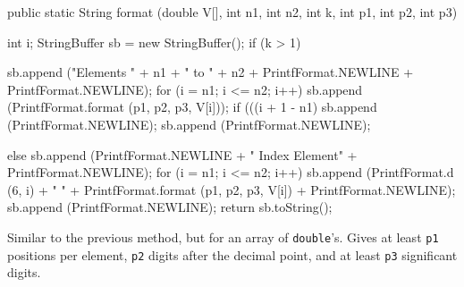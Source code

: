 \begin{code}

   public static String format (double V[], int n1, int n2,
                                int k, int p1, int p2, int p3)\begin{hide} {
      int i;
      StringBuffer sb = new StringBuffer();
      if (k > 1) {
         sb.append ("Elements  " + n1 + "  to  " + n2  +
                     PrintfFormat.NEWLINE + PrintfFormat.NEWLINE);
         for (i = n1; i <= n2; i++) {
            sb.append (PrintfFormat.format (p1, p2, p3, V[i]));
            if (((i + 1 - n1) %
               sb.append (PrintfFormat.NEWLINE);
         }
         sb.append (PrintfFormat.NEWLINE);

      } else {
         sb.append (PrintfFormat.NEWLINE + " Index            Element" +
                    PrintfFormat.NEWLINE);
         for (i = n1; i <= n2; i++)
            sb.append (PrintfFormat.d (6, i) + "   " +
                       PrintfFormat.format (p1, p2, p3, V[i]) +
                       PrintfFormat.NEWLINE);
      }
      sb.append (PrintfFormat.NEWLINE);
      return sb.toString();
   }\end{hide}
\end{code}
 \begin{tabb}  Similar to the previous method, but for an array of \texttt{double}'s.
  Gives at least \texttt{p1} positions per element,
  \texttt{p2} digits after the decimal point, and at least \texttt{p3}
  significant digits.
 \end{tabb}
\begin{htmlonly}
\end{htmlonly}
